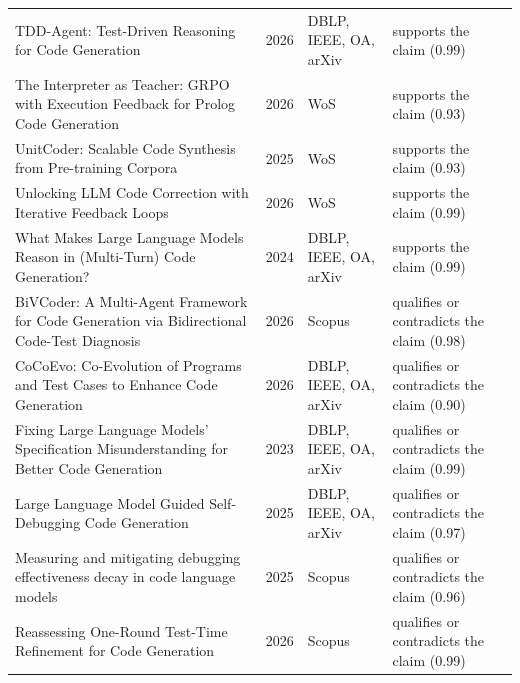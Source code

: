 \begin{longtable}{@{}%
  >{\raggedright\arraybackslash}p{}c%
  >{\raggedright\arraybackslash}p{}%
  >{\raggedright\arraybackslash}p{}@{}}
TDD-Agent: Test-Driven Reasoning for Code Generation & 2026 & DBLP, IEEE, OA, arXiv & supports the claim (0.99) \\
The Interpreter as Teacher: GRPO with Execution Feedback for Prolog Code Generation & 2026 & WoS & supports the claim (0.93) \\
UnitCoder: Scalable Code Synthesis from Pre-training Corpora & 2025 & WoS & supports the claim (0.93) \\
Unlocking LLM Code Correction with Iterative Feedback Loops & 2026 & WoS & supports the claim (0.99) \\
What Makes Large Language Models Reason in (Multi-Turn) Code Generation? & 2024 & DBLP, IEEE, OA, arXiv & supports the claim (0.99) \\
BiVCoder: A Multi-Agent Framework for Code Generation via Bidirectional Code-Test Diagnosis & 2026 & Scopus & qualifies or contradicts the claim (0.98) \\
CoCoEvo: Co-Evolution of Programs and Test Cases to Enhance Code Generation & 2026 & DBLP, IEEE, OA, arXiv & qualifies or contradicts the claim (0.90) \\
Fixing Large Language Models' Specification Misunderstanding for Better Code Generation & 2023 & DBLP, IEEE, OA, arXiv & qualifies or contradicts the claim (0.99) \\
Large Language Model Guided Self-Debugging Code Generation & 2025 & DBLP, IEEE, OA, arXiv & qualifies or contradicts the claim (0.97) \\
Measuring and mitigating debugging effectiveness decay in code language models & 2025 & Scopus & qualifies or contradicts the claim (0.96) \\
Reassessing One-Round Test-Time Refinement for Code Generation & 2026 & Scopus & qualifies or contradicts the claim (0.99) \\
\end{longtable}
\endgroup
